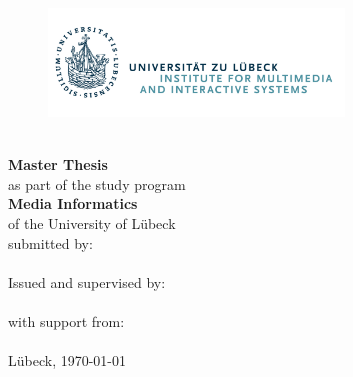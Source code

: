 \begin{titlepage}
    \begin{figure}[t]
        \centering
        \includegraphics[width=0.7\textwidth]{img/uzl_logo_en.png}
    \end{figure}
    \begin{center}
        \selectfont
        \Large
        \begin{onehalfspace}
            \textbf{\titelMAEnglish}
        \end{onehalfspace}
        \vspace{0.5cm}
        \normalsize
        \textit{\titelMAGerman}\\
        \vspace{1cm}
        \normalsize
        \textbf{Master Thesis}\\
        \vspace{0.2cm}
        as part of the study program\\
        \textbf{Media Informatics}\\
        of the University of Lübeck\\
        \vspace{1cm}
        submitted by:\\ \textbf{\authorMA}\\
        \vspace{1cm}
        Issued and supervised by:\\ \textbf{\examinerMA}\\
        \vspace{0.5cm}
        with support from:\\ \textbf{\supporterMA}\\
        \vspace{0.8cm}
        Lübeck, \today
    \end{center}        
\end{titlepage}